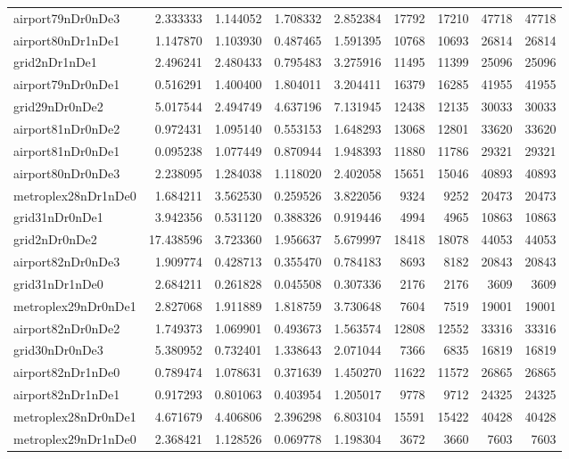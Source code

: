 \begin{longtable}{|l|r|r|r|r|r|r|r|r|}
airport79nDr0nDe3 & 2.333333 & 1.144052 & 1.708332 & 2.852384 & 17792 & 17210 & 47718 & 47718 \\
airport80nDr1nDe1 & 1.147870 & 1.103930 & 0.487465 & 1.591395 & 10768 & 10693 & 26814 & 26814 \\
grid2nDr1nDe1 & 2.496241 & 2.480433 & 0.795483 & 3.275916 & 11495 & 11399 & 25096 & 25096 \\
airport79nDr0nDe1 & 0.516291 & 1.400400 & 1.804011 & 3.204411 & 16379 & 16285 & 41955 & 41955 \\
grid29nDr0nDe2 & 5.017544 & 2.494749 & 4.637196 & 7.131945 & 12438 & 12135 & 30033 & 30033 \\
airport81nDr0nDe2 & 0.972431 & 1.095140 & 0.553153 & 1.648293 & 13068 & 12801 & 33620 & 33620 \\
airport81nDr0nDe1 & 0.095238 & 1.077449 & 0.870944 & 1.948393 & 11880 & 11786 & 29321 & 29321 \\
airport80nDr0nDe3 & 2.238095 & 1.284038 & 1.118020 & 2.402058 & 15651 & 15046 & 40893 & 40893 \\
metroplex28nDr1nDe0 & 1.684211 & 3.562530 & 0.259526 & 3.822056 & 9324 & 9252 & 20473 & 20473 \\
grid31nDr0nDe1 & 3.942356 & 0.531120 & 0.388326 & 0.919446 & 4994 & 4965 & 10863 & 10863 \\
grid2nDr0nDe2 & 17.438596 & 3.723360 & 1.956637 & 5.679997 & 18418 & 18078 & 44053 & 44053 \\
airport82nDr0nDe3 & 1.909774 & 0.428713 & 0.355470 & 0.784183 & 8693 & 8182 & 20843 & 20843 \\
grid31nDr1nDe0 & 2.684211 & 0.261828 & 0.045508 & 0.307336 & 2176 & 2176 & 3609 & 3609 \\
metroplex29nDr0nDe1 & 2.827068 & 1.911889 & 1.818759 & 3.730648 & 7604 & 7519 & 19001 & 19001 \\
airport82nDr0nDe2 & 1.749373 & 1.069901 & 0.493673 & 1.563574 & 12808 & 12552 & 33316 & 33316 \\
grid30nDr0nDe3 & 5.380952 & 0.732401 & 1.338643 & 2.071044 & 7366 & 6835 & 16819 & 16819 \\
airport82nDr1nDe0 & 0.789474 & 1.078631 & 0.371639 & 1.450270 & 11622 & 11572 & 26865 & 26865 \\
airport82nDr1nDe1 & 0.917293 & 0.801063 & 0.403954 & 1.205017 & 9778 & 9712 & 24325 & 24325 \\
metroplex28nDr0nDe1 & 4.671679 & 4.406806 & 2.396298 & 6.803104 & 15591 & 15422 & 40428 & 40428 \\
metroplex29nDr1nDe0 & 2.368421 & 1.128526 & 0.069778 & 1.198304 & 3672 & 3660 & 7603 & 7603 \\

\end{longtable}
